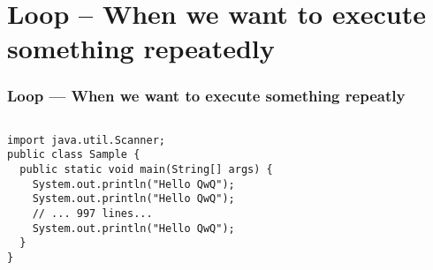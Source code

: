\documentclass[en, 11pt, xcolor=dvipsnames]{beamer}
\begin{document}
\section{Loop -- When we want to execute something repeatedly}
\begin{frame}[fragile]
	\frametitle{Loop --- When we want to execute something repeatly}



	\begin{columns}[c]
		\begin{column}{0.98\textwidth}

			\begin{lstlisting}[style=Java]
import java.util.Scanner;
public class Sample {
  public static void main(String[] args) {
    System.out.println("Hello QwQ");
    System.out.println("Hello QwQ");
    // ... 997 lines...
    System.out.println("Hello QwQ");
  }
}\end{lstlisting}


		\end{column}
	\end{columns}
\end{frame}
\end{document}
